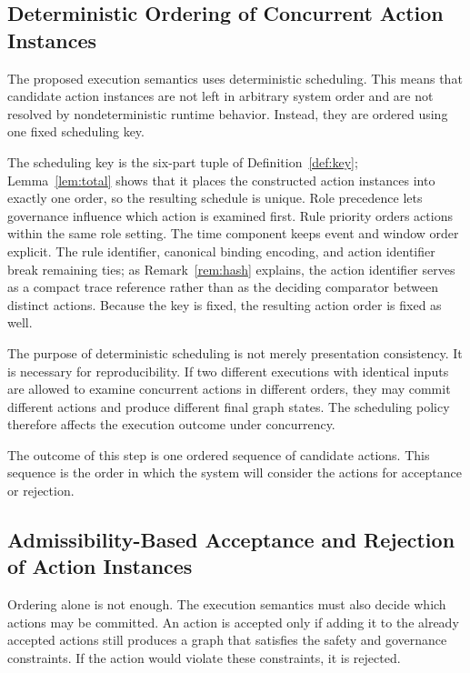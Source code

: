 \documentclass{ieeeaccess}
\theoremstyle{definition}
\theoremstyle{plain}
\theoremstyle{remark}
\begin{document}
\subsection{Deterministic Ordering of Concurrent Action Instances}

The proposed execution semantics uses deterministic scheduling. This means that candidate action instances are not left in arbitrary system order and are not resolved by nondeterministic runtime behavior. Instead, they are ordered using one fixed scheduling key.

The scheduling key is the six-part tuple of Definition~\ref{def:key}; Lemma~\ref{lem:total} shows that it places the constructed action instances into exactly one order, so the resulting schedule is unique.
Role precedence lets governance influence which action is examined first. Rule priority orders actions within the same role setting. The time component keeps event and window order explicit. The rule identifier, canonical binding encoding, and action identifier break remaining ties; as Remark~\ref{rem:hash} explains, the action identifier serves as a compact trace reference rather than as the deciding comparator between distinct actions. Because the key is fixed, the resulting action order is fixed as well.

The purpose of deterministic scheduling is not merely presentation consistency. It is necessary for reproducibility. If two different executions with identical inputs are allowed to examine concurrent actions in different orders, they may commit different actions and produce different final graph states. The scheduling policy therefore affects the execution outcome under concurrency.

The outcome of this step is one ordered sequence of candidate actions. This sequence is the order in which the system will consider the actions for acceptance or rejection.

\subsection{Admissibility-Based Acceptance and Rejection of Action Instances}
\label{sec:admissibility-resolution}

Ordering alone is not enough. The execution semantics must also decide which actions may be committed. An action is accepted only if adding it to the already accepted actions still produces a graph that satisfies the safety and governance constraints. If the action would violate these constraints, it is rejected.
\end{document}
